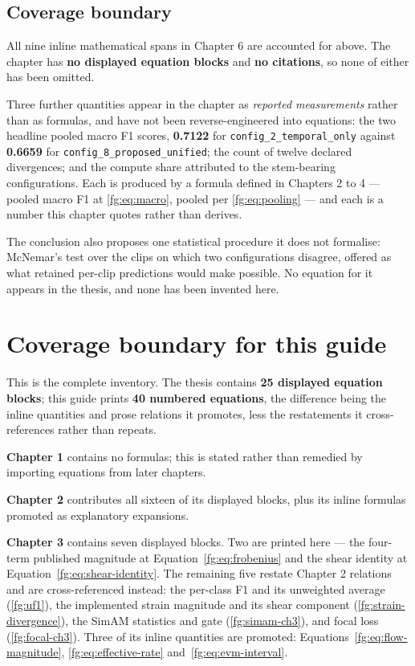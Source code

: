 \documentclass[11pt,a4paper]{article}
\numberwithin{equation}{section}
\begin{document}
\subsection{Coverage boundary}

All nine inline mathematical spans in Chapter 6 are accounted for above. The
chapter has \textbf{no displayed equation blocks} and \textbf{no citations},
so none of either has been omitted.

Three further quantities appear in the chapter as \emph{reported measurements}
rather than as formulas, and have not been reverse-engineered into equations:
the two headline pooled macro F1 scores, \textbf{0.7122} for
\texttt{config\_2\_temporal\_only} against \textbf{0.6659} for
\texttt{config\_8\_proposed\_unified}; the count of twelve declared
divergences; and the compute share attributed to the stem-bearing
configurations. Each is produced by a formula defined in Chapters 2 to 4 ---
pooled macro F1 at \eqref{fg:eq:macro}, pooled per \eqref{fg:eq:pooling} --- and each is
a number this chapter quotes rather than derives.

The conclusion also proposes one statistical procedure it does not formalise:
McNemar's test over the clips on which two configurations disagree, offered as
what retained per-clip predictions would make possible. No equation for it
appears in the thesis, and none has been invented here.

\section{Coverage boundary for this guide}
\label{fg:coverage}

This is the complete inventory. The thesis contains \textbf{25 displayed
equation blocks}; this guide prints \textbf{40 numbered equations}, the
difference being the inline quantities and prose relations it promotes, less
the restatements it cross-references rather than repeats.

\textbf{Chapter 1} contains no formulas; this is stated rather than remedied by
importing equations from later chapters.

\textbf{Chapter 2} contributes all sixteen of its displayed blocks, plus its
inline formulas promoted as explanatory expansions.

\textbf{Chapter 3} contains seven displayed blocks. Two are printed here ---
the four-term published magnitude at Equation~\eqref{fg:eq:frobenius} and the
shear identity at Equation~\eqref{fg:eq:shear-identity}. The remaining five
restate Chapter 2 relations and are cross-referenced instead: the per-class F1
and its unweighted average (\autoref{fg:uf1}), the implemented strain
magnitude and its shear component (\autoref{fg:strain-divergence}), the SimAM
statistics and gate (\autoref{fg:simam-ch3}), and focal loss
(\autoref{fg:focal-ch3}). Three of its inline quantities are promoted:
Equations~\eqref{fg:eq:flow-magnitude}, \eqref{fg:eq:effective-rate}
and~\eqref{fg:eq:evm-interval}.
\end{document}
